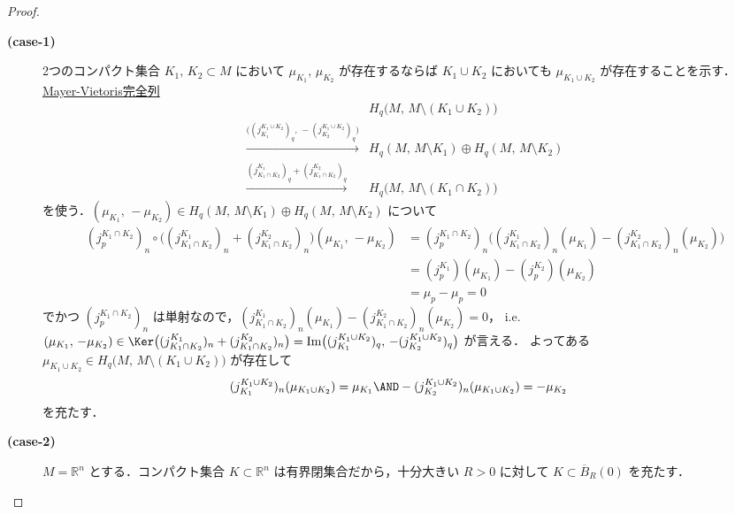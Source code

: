 \documentclass[algtopo_main]{subfiles}
\begin{document}
\begin{proof}
    \begin{description}
        \item[\textbf{(case-1)}] 2つのコンパクト集合 $K_1,\, K_2 \subset M$ において $\mu_{K_1},\, \mu_{K_2}$ が存在するならば $K_1 \cup K_2$ においても $\mu_{K_1 \cup K_2}$ が存在することを示す．
            \hyperref[thm:MV-rel]{Mayer-Vietoris完全列}
            \begin{align}
                \label{eq:lem-fundamental-class-MV-2}
                &H_q \bigl( M,\, M \setminus (K_1 \cup K_2) \bigr) \\
                \xrightarrow{\bigl((j_{K_1}^{K_1\cup K_2})_q,\, -(j_{K_2}^{K_1\cup K_2})_q\bigr)} &H_q (M,\, M \setminus K_1) \oplus H_q(M,\, M \setminus K_2) \\
                \xrightarrow{(j_{K_1 \cap K_2}^{K_1})_q + (j_{K_1 \cap K_2}^{K_2})_q} &H_q \bigl(M,\, M \setminus (K_1 \cap K_2)\bigr)
            \end{align}
            を使う．$(\mu_{K_1},\, - \mu_{K_2}) \in H_q (M,\, M \setminus K_1) \oplus H_q(M,\, M \setminus K_2)$ について
            \begin{align}
                (j_p^{K_1 \cap K_2})_n \circ \bigl( (j_{K_1 \cap K_2}^{K_1})_n + (j_{K_1 \cap K_2}^{K_2})_n \bigr) (\mu_{K_1},\, - \mu_{K_2}) &= (j_p^{K_1 \cap K_2})_n \bigl((j_{K_1 \cap K_2}^{K_1})_n(\mu_{K_1}) - (j_{K_1 \cap K_2}^{K_2})_n(\mu_{K_2})\bigr) \\
                &= (j_p^{K_1})(\mu_{K_1}) - (j_p^{K_2})(\mu_{K_2}) \\
                &= \mu_p - \mu_p = 0
            \end{align}
            でかつ $(j_p^{K_1 \cap K_2})_n$ は単射なので，$(j_{K_1 \cap K_2}^{K_1})_n(\mu_{K_1}) - (j_{K_1 \cap K_2}^{K_2})_n(\mu_{K_2}) = 0$，
            i.e. $(\mu_{K_1},\, - \mu_{K_2}) \in \Ker \bigl( (j_{K_1 \cap K_2}^{K_1})_n + (j_{K_1 \cap K_2}^{K_2})_n \bigr) = \Im \bigl((j_{K_1}^{K_1\cup K_2})_q,\, -(j_{K_2}^{K_1\cup K_2})_q\bigr)$ が言える．
            よってある $\mu_{K_1 \cup K_2} \in H_q \bigl( M,\, M \setminus (K_1 \cup K_2) \bigr)$ が存在して
            \begin{align}
                (j_{K_1}^{K_1\cup K_2})_n (\mu_{K_1 \cup K_2}) &= \mu_{K_1} \AND
                -(j_{K_2}^{K_1\cup K_2})_n (\mu_{K_1 \cup K_2}) = -\mu_{K_2}
            \end{align}
            を充たす．
            
            \item[\textbf{(case-2)}] $M = \mathbb{R}^n$ とする．コンパクト集合 $K \subset \mathbb{R}^n$ は有界閉集合だから，十分大きい $R > 0$ に対して $K \subset \overline{B}_R(0)$ を充たす．
            

\end{description}
\end{proof}
\end{document}
